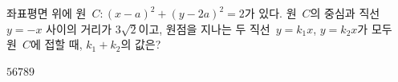 좌표평면 위에 원~$C: (x-a)^2+(y-2a)^2=2$가 있다. 원~$C$의 중심과 직선~$y=-x$ 사이의 거리가 $3\sqrt{2}$이고, 원점을 지나는 두 직선~$y=k_1x$, $y=k_2x$가 모두 원~$C$에 접할 때, $k_1+k_2$의 값은? 
\begin{choices32}{$5$}{$6$}{$7$}{$8$}{$9$}\end{choices32}
